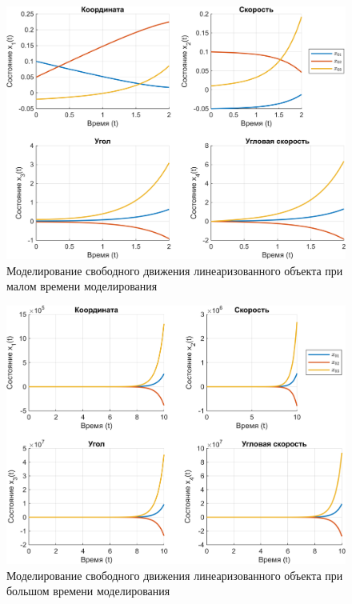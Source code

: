 \begin{figure}[H]
    \centering
    \includegraphics[width=\linewidth]{figs/2.3.lin_free_t_low.png}
    \caption{Моделирование свободного движения линеаризованного объекта
    при малом времени моделирования}
    \label{fig:2.3.lin_free_t_low}
\end{figure}
\begin{figure}[H]
    \centering
    \includegraphics[width=\linewidth]{figs/2.3.lin_free_t_high.png}
    \caption{Моделирование свободного движения линеаризованного объекта
    при большом времени моделирования}
    \label{fig:2.3.lin_free_t_high}
\end{figure}


